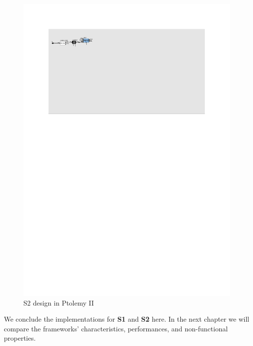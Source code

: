 \begin{figure}[hbt!]
  \centering
  \includegraphics[scale=2.1]{figures/s2_pt_internal.pdf}
  \caption{S2 design in Ptolemy II}
  \label{fig:s2_pt_internal}
\end{figure}

We conclude the implementations for \textbf{S1} and \textbf{S2} here. In the next chapter we will compare the frameworks' characteristics, performances, and non-functional properties.
